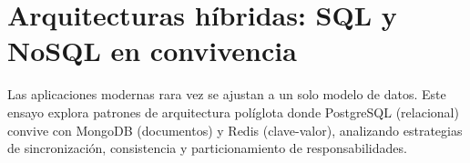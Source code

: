 \section*{Arquitecturas híbridas: SQL y NoSQL en convivencia}

Las aplicaciones modernas rara vez se ajustan a un solo modelo de datos. Este ensayo explora patrones de arquitectura políglota donde PostgreSQL (relacional) convive con MongoDB (documentos) y Redis (clave-valor), analizando estrategias de sincronización, consistencia y particionamiento de responsabilidades.
